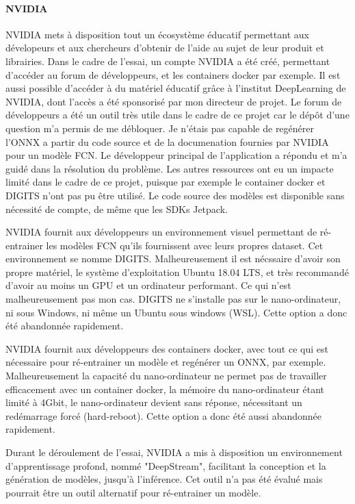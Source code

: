 \paragraph{NVIDIA}
\par NVIDIA mets à disposition tout un écosystème éducatif permettant aux dévelopeurs et aux chercheurs d'obtenir de l'aide au sujet de leur produit et librairies. Dans le cadre de l'essai, un compte NVIDIA a été créé, permettant d'accéder au forum de développeurs, et les containers  docker par exemple. Il est aussi possible d'accéder à du matériel éducatif grâce à l'institut DeepLearning de NVIDIA, dont l'accès a été sponsorisé par mon directeur de projet. Le forum de développeurs a été un outil très utile dans le cadre de ce projet car le dépôt d'une question m'a permis de me débloquer. Je n'étais pas capable de regénérer l'ONNX a partir du code source et de la documenation fournies par NVIDIA pour un modèle FCN. Le développeur principal de l'application a répondu et m'a guidé dans la résolution du problème. Les autres ressources ont eu un impacte limité dans le cadre de ce projet, puisque par exemple le container docker et DIGITS n'ont pas pu être utilisé. Le code source des modèles est disponible sans nécessité de compte, de même que les SDKs Jetpack.
\par NVIDIA fournit aux développeurs un environnement visuel permettant de ré-entrainer les modèles FCN qu'ils fournissent avec leurs propres dataset. Cet environnement se nomme DIGITS. Malheureusement il est nécssaire d'avoir son propre matériel, le système d'exploitation Ubuntu 18.04 LTS, et très recommandé d'avoir au moins un GPU et un ordinateur performant. Ce qui n'est malheureusement pas mon cas. DIGITS ne s'installe pas sur le nano-ordinateur, ni sous Windows, ni même un Ubuntu sous windows (WSL). Cette option a donc été abandonnée rapidement. 
\par NVIDIA fournit aux développeurs des containers docker, avec tout ce qui est nécessaire pour ré-entrainer un modèle et regénérer un ONNX, par exemple. Malheureusement la capacité du nano-ordinateur ne permet pas de travailler efficacement avec un container docker, la mémoire du nano-ordinateur étant limité à 4Gbit, le nano-ordinateur devient sans réponse, nécessitant un redémarrage forcé (hard-reboot). Cette option a donc été aussi abandonnée rapidement. 
\par Durant le déroulement de l'essai, NVIDIA a mis à disposition un environnement d'apprentissage profond, nommé "DeepStream", facilitant la conception et la génération de modèles, jusqu'à l'inférence. Cet outil n'a pas été évalué mais pourrait être un outil alternatif pour ré-entrainer un modèle.
